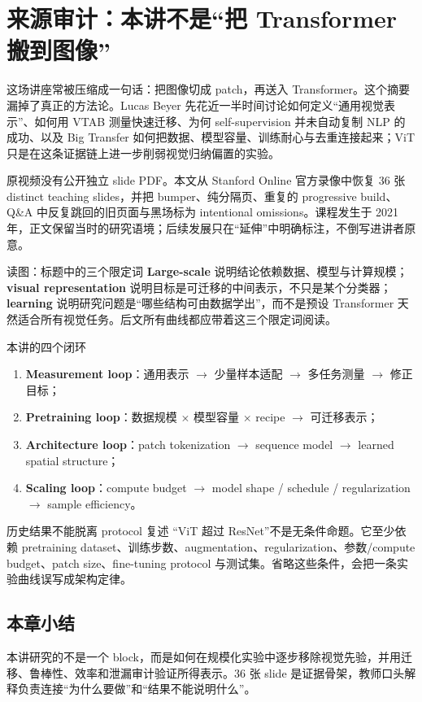 \section{来源审计：本讲不是“把 Transformer 搬到图像”}

这场讲座常被压缩成一句话：把图像切成 patch，再送入 Transformer。这个摘要漏掉了真正的方法论。Lucas Beyer 先花近一半时间讨论如何定义“通用视觉表示”、如何用 VTAB 测量快速迁移、为何 self-supervision 并未自动复制 NLP 的成功、以及 Big Transfer 如何把数据、模型容量、训练耐心与去重连接起来；ViT 只是在这条证据链上进一步削弱视觉归纳偏置的实验。

原视频没有公开独立 slide PDF。本文从 Stanford Online 官方录像中恢复 36 张 distinct teaching slides，并把 bumper、纯分隔页、重复的 progressive build、Q\&A 中反复跳回的旧页面与黑场标为 intentional omissions。课程发生于 2021 年，正文保留当时的研究语境；后续发展只在“延伸”中明确标注，不倒写进讲者原意。


\begin{knowledgebox}{读图：标题中的三个限定词}
\textbf{Large-scale} 说明结论依赖数据、模型与计算规模；\textbf{visual representation} 说明目标是可迁移的中间表示，不只是某个分类器；\textbf{learning} 说明研究问题是“哪些结构可由数据学出”，而不是预设 Transformer 天然适合所有视觉任务。后文所有曲线都应带着这三个限定词阅读。
\end{knowledgebox}

\begin{importantbox}{本讲的四个闭环}
\begin{enumerate}
  \item \textbf{Measurement loop}：通用表示 $\rightarrow$ 少量样本适配 $\rightarrow$ 多任务测量 $\rightarrow$ 修正目标；
  \item \textbf{Pretraining loop}：数据规模 $\times$ 模型容量 $\times$ recipe $\rightarrow$ 可迁移表示；
  \item \textbf{Architecture loop}：patch tokenization $\rightarrow$ sequence model $\rightarrow$ learned spatial structure；
  \item \textbf{Scaling loop}：compute budget $\rightarrow$ model shape / schedule / regularization $\rightarrow$ sample efficiency。
\end{enumerate}
\end{importantbox}

\begin{warningbox}{历史结果不能脱离 protocol 复述}
“ViT 超过 ResNet”不是无条件命题。它至少依赖 pretraining dataset、训练步数、augmentation、regularization、参数/compute budget、patch size、fine-tuning protocol 与测试集。省略这些条件，会把一条实验曲线误写成架构定律。
\end{warningbox}

\subsection{本章小结}

本讲研究的不是一个 block，而是如何在规模化实验中逐步移除视觉先验，并用迁移、鲁棒性、效率和泄漏审计验证所得表示。36 张 slide 是证据骨架，教师口头解释负责连接“为什么要做”和“结果不能说明什么”。


